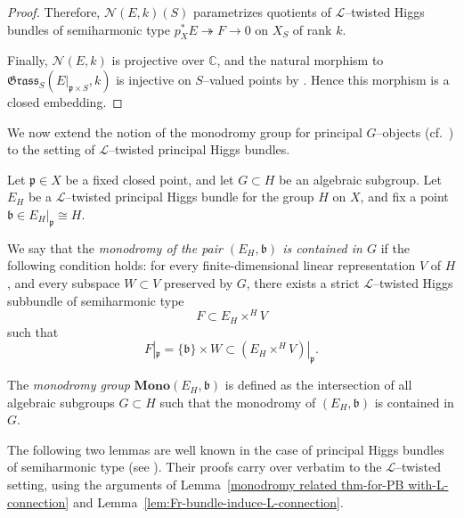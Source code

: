 \documentclass[12pt,reqno]{amsart}
\numberwithin{equation}{subsection}
\theoremstyle{definition}
\theoremstyle{theorem}
\begin{document}
\begin{proof}
	Therefore, $\mathcal{N}(E,k)(S)$ parametrizes quotients of
	$\mathcal{L}$--twisted Higgs bundles of semiharmonic type
	$p_X^{*}E \twoheadrightarrow F \to 0$
	on $X_S$ of rank $k$.
	
	Finally, $\mathcal{N}(E,k)$ is projective over $\mathbb{C}$, and the
	natural morphism to
	$\mathfrak{Grass}_{S}(E|_{\mathfrak{p}\times S},k)$
	is injective on $S$--valued points by
	\cite[\S\,4, Lemma~4.9]{CT.Simpson-1994}. Hence this morphism is a closed embedding.
\end{proof}


We now extend the notion of the monodromy group for principal $G$--objects
(cf.~\cite[\S\,9, p.~50]{CT.Simpson-1995}) to the setting of
$\mathcal{L}$--twisted principal Higgs bundles.

Let $\mathfrak{p} \in X$ be a fixed closed point, and let $G \subset H$
be an algebraic subgroup.
Let $E_H$ be a $\mathcal{L}$--twisted principal Higgs bundle for the group
$H$ on $X$, and fix a point
$\mathfrak{b} \in E_H|_{\mathfrak{p}} \cong H$.

We say that the \emph{monodromy of the pair $(E_H,\mathfrak{b})$ is
contained in $G$} if the following condition holds:
for every finite-dimensional linear representation $V$ of $H$, and every
subspace $W \subset V$ preserved by $G$, there exists a strict
$\mathcal{L}$--twisted Higgs subbundle of semiharmonic type
\[
F \subset E_H \times^{H} V
\]
such that
\[
F|_{\mathfrak{p}}
=
\{\mathfrak{b}\} \times W
\subset
(E_H \times^{H} V)|_{\mathfrak{p}}.
\]

The \emph{monodromy group} $\mathbf{Mono}(E_H,\mathfrak{b})$ is defined as
the intersection of all algebraic subgroups $G \subset H$ such that the
monodromy of $(E_H,\mathfrak{b})$ is contained in $G$.


The following two lemmas are well known in the case of principal Higgs
bundles of semiharmonic type (see
\cite[\S\,9, Lemmas~9.4 and~9.5]{CT.Simpson-1995}).
Their proofs carry over verbatim to the $\mathcal{L}$--twisted setting,
using the arguments of
Lemma~\eqref{monodromy related thm-for-PB with-L-connection} and
Lemma~\eqref{lem:Fr-bundle-induce-L-connection}.
\end{document}
